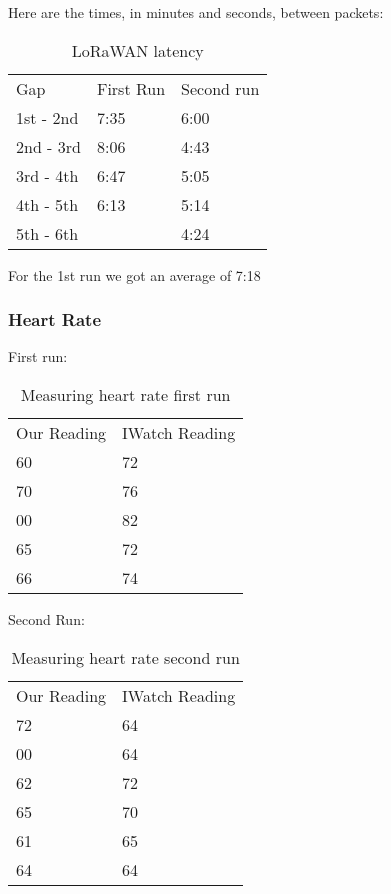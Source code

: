 			Here are the times, in minutes and seconds, between packets:
			\begin{table}[h]
				\begin{tabular}{@{}lll@{}}
					Gap 	    &	First Run   & 	Second run 	 \\
					1st - 2nd 	&	7:35		& 	6:00     	 \\
					2nd - 3rd 	&	8:06    	& 	4:43         \\
					3rd - 4th 	&	6:47		& 	5:05         \\
					4th - 5th 	&	6:13    	& 	5:14         \\
					5th - 6th 	&	         	& 	4:24         \\
				\end{tabular}
				\caption[LoRaWAN latency]{LoRaWAN latency}
				\label{tab:Latency}
			\end{table}

			For the 1st run we got an average of 7:18

		\subsubsection{Heart Rate}
			First run:
			\begin{table}[h]
				\begin{tabular}{@{}ll@{}}
					Our Reading & IWatch Reading \\
					60          & 72             \\
					70          & 76             \\
					00          & 82             \\
					65          & 72             \\
					66          & 74            
				\end{tabular}
				\caption[Measuring heart rate first run]{Measuring heart rate first run}
				\label{tab:HeartRateFirst}
			\end{table}
			Second Run:
			\begin{table}[h]
				\begin{tabular}{@{}ll@{}}
					Our Reading & IWatch Reading \\
					72          & 64             \\
					00          & 64             \\
					62          & 72             \\
					65          & 70             \\
					61          & 65      		 \\      
					64          & 64
				\end{tabular}
				\caption[Measuring heart rate second run]{Measuring heart rate second run}
				\label{tab:HeartRateSecond}
			\end{table}

